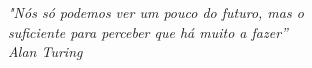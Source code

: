 \begin{epigrafe}
\vspace*{\fill}
\begin{flushright}
\emph{"Nós só podemos ver um pouco do futuro, mas o 
 \\suficiente para perceber que há muito a fazer” 
  \\ Alan Turing}
\end{flushright}
\end{epigrafe}